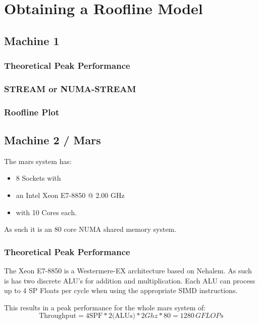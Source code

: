 
\lstset{
	basicstyle=\small,
	language=C
}

\section{Obtaining a Roofline Model}

\subsection{Machine 1}

\subsubsection{Theoretical Peak Performance}

\subsubsection{STREAM or NUMA-STREAM}

\subsubsection{Roofline Plot}


\subsection{Machine 2 / Mars}

The mars system has:
 \begin{itemize}
 	\item 8 Sockets with
	\item an Intel Xeon E7-8850 @ 2.00 GHz
	\item with 10 Cores each.
\end{itemize}

As such it is an 80 core NUMA shared memory system.

\subsubsection{Theoretical Peak Performance}

The Xeon E7-8850 is a Westermere-EX architecture based on Nehalem.\cite{wikichip}
As such is has two discrete ALU's for addition and multiplication.
Each ALU can process up to 4 SP Floats per cycle when using the appropriate SIMD instructions.\cite{agnerorg}

This results in a peak performance for the whole mars system of:
$$\text{Throughput} = 4 \text{SPF} * 2 \text{(ALUs)} * 2 Ghz * 80 = 1280 \, GFLOPs$$

